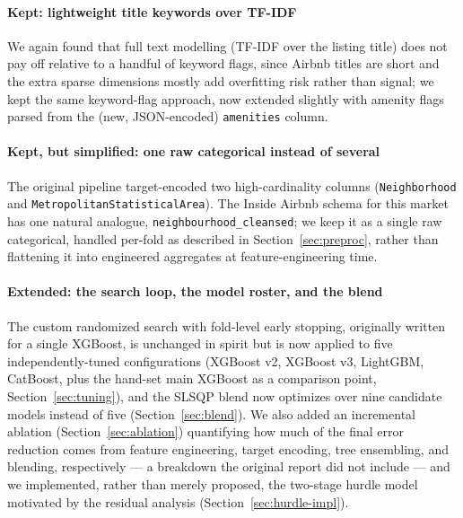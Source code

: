 \documentclass[journal]{IEEEtran}
\begin{document}
\paragraph{Kept: lightweight title keywords over TF-IDF} We again found that
full text modelling (TF-IDF over the listing title) does not pay off relative
to a handful of keyword flags, since Airbnb titles are short and the
extra sparse dimensions mostly add overfitting risk rather than signal; we kept
the same keyword-flag approach, now extended slightly with amenity flags parsed
from the (new, JSON-encoded) \texttt{amenities} column.

\paragraph{Kept, but simplified: one raw categorical instead of several} The
original pipeline target-encoded two high-cardinality columns
(\texttt{Neighborhood} and \texttt{MetropolitanStatisticalArea}). The Inside
Airbnb schema for this market has one natural analogue,
\texttt{neighbourhood\_cleansed}; we keep it as a single raw categorical,
handled per-fold as described in Section~\ref{sec:preproc}, rather than
flattening it into engineered aggregates at feature-engineering time.

\paragraph{Extended: the search loop, the model roster, and the blend} The
custom randomized search with fold-level early stopping, originally written for
a single XGBoost, is unchanged in spirit but is now applied to five
independently-tuned configurations (XGBoost v2, XGBoost v3, LightGBM, CatBoost,
plus the hand-set main XGBoost as a comparison point,
Section~\ref{sec:tuning}), and the SLSQP blend now optimizes over nine
candidate models instead of five (Section~\ref{sec:blend}). We also added an
incremental ablation (Section~\ref{sec:ablation}) quantifying how much of the
final error reduction comes from feature engineering, target encoding, tree
ensembling, and blending, respectively --- a breakdown the original report did
not include --- and we implemented, rather than merely proposed, the two-stage
hurdle model motivated by the residual analysis (Section~\ref{sec:hurdle-impl}).
\end{document}
